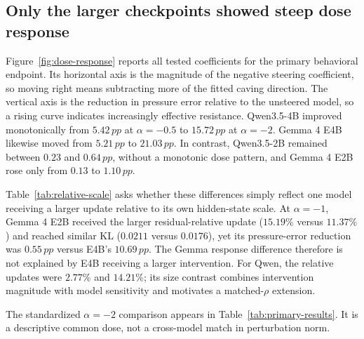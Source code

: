 \documentclass[11pt]{article}
\newcommand{\pp}{\,pp}
\begin{document}
\subsection{Only the larger checkpoints showed steep dose response}
\label{sec:behavior-results}

\begingroup
\let\paperoriginalfigure\figure
\let\paperoriginalendfigure\endfigure
\renewenvironment{figure}[1][]{\paperoriginalfigure[H]}{\paperoriginalendfigure}

\endgroup

Figure~\ref{fig:dose-response} reports all tested coefficients for the primary
behavioral endpoint. Its horizontal axis is the magnitude of the negative
steering coefficient, so moving right means subtracting more of the fitted
caving direction. The vertical axis is the reduction in pressure error relative
to the unsteered model, so a rising curve indicates increasingly effective
resistance. Qwen3.5-4B improved monotonically from $5.42\pp$ at
$\alpha=-0.5$ to $15.72\pp$ at $\alpha=-2$. Gemma 4 E4B likewise moved from
$5.21\pp$ to $21.03\pp$. In contrast, Qwen3.5-2B remained between $0.23$ and
$0.64\pp$, without a monotonic dose pattern, and Gemma 4 E2B rose only from
$0.13$ to $1.10\pp$.

\begingroup
\let\paperoriginaltable\table
\let\paperoriginalendtable\endtable
\renewenvironment{table}[1][]{\paperoriginaltable[H]}{\paperoriginalendtable}

\endgroup

Table~\ref{tab:relative-scale} asks whether these differences simply reflect
one model receiving a larger update relative to its own hidden-state scale. At
$\alpha=-1$, Gemma 4 E2B received the larger residual-relative update
($15.19\%$ versus $11.37\%$) and reached similar KL ($0.0211$ versus
$0.0176$), yet its pressure-error reduction was $0.55\pp$ versus E4B's
$10.69\pp$. The Gemma response difference therefore is not explained by E4B
receiving a larger intervention. For Qwen, the relative updates were $2.77\%$
and $14.21\%$; its size contrast combines intervention magnitude with model
sensitivity and motivates a matched-$\rho$ extension.

The standardized $\alpha=-2$ comparison appears in
Table~\ref{tab:primary-results}. It is a descriptive common dose, not a
cross-model match in perturbation norm.

\begingroup
\setlength{\tabcolsep}{2.6pt}
\let\paperoriginaltable\table
\let\paperoriginalendtable\endtable
\renewenvironment{table}[1][]{\paperoriginaltable[H]}{\paperoriginalendtable}

\endgroup
\end{document}
